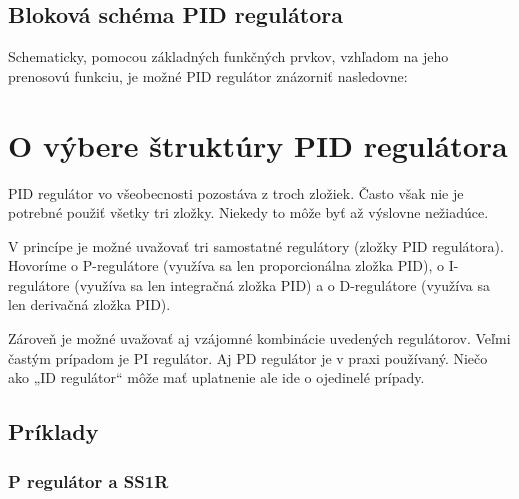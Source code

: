 \documentclass[a4paper, 10pt, ]{article}
\begin{document}
\subsection{Bloková schéma PID regulátora}

Schematicky, pomocou základných funkčných prvkov, vzhľadom na jeho prenosovú funkciu, je možné PID regulátor znázorniť nasledovne:

\begin{center}

    \vspace{-1mm}


    \vspace{-3mm}

	\label{PID_blokSch.pdf}

    \vspace{-1mm}

\end{center}






\section{O výbere štruktúry PID regulátora}

PID regulátor vo všeobecnosti pozostáva z troch zložiek. Často však nie je potrebné použiť všetky tri zložky. Niekedy to môže byť až výslovne nežiadúce.

V princípe je možné uvažovať tri samostatné regulátory (zložky PID regulátora). Hovoríme o P-regulátore (využíva sa len proporcionálna zložka PID), o I-regulátore (využíva sa len integračná zložka PID) a o D-regulátore (využíva sa len derivačná zložka PID).

Zároveň je možné uvažovať aj vzájomné kombinácie uvedených regulátorov. Veľmi častým prípadom je PI regulátor. Aj PD regulátor je v praxi používaný. Niečo ako „ID regulátor“ môže mať uplatnenie ale ide o ojedinelé prípady.



\subsection{Príklady}


\subsubsection{P regulátor a SS1R}
\end{document}
